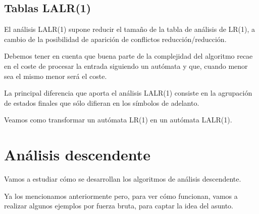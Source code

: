 \documentclass{apuntes}
\begin{document}
\subsection{Tablas LALR(1)}

El análisis LALR(1) supone reducir el tamaño de la tabla de análisis de LR(1), a cambio de la posibilidad de aparición de conflictos reducción/reducción.

Debemos tener en cuenta que buena parte de la complejidad del algoritmo recae en el coste de procesar la entrada siguiendo un autómata y que, cuando menor sea el mismo menor será el coste.

La principal diferencia que aporta el análisis LALR(1) consiste en la agrupación de estados finales que sólo difieran en los símbolos de adelanto.

Veamos como transformar un autómata LR(1) en un autómata LALR(1).






\section{Análisis descendente}
Vamos a estudiar cómo se desarrollan los algoritmos de análisis descendente.

Ya los mencionamos anteriormente pero, para ver cómo funcionan, vamos a realizar algunos ejemplos por fuerza bruta, para captar la idea del asunto.
\end{document}
